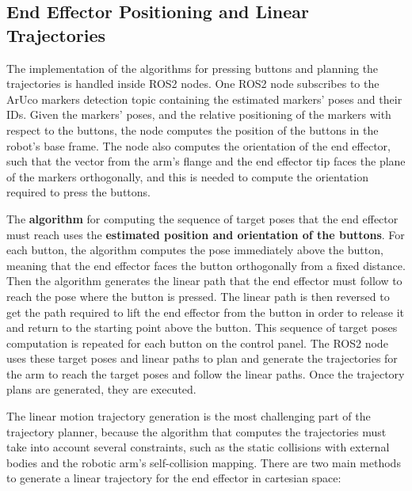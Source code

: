 \subsection{End Effector Positioning and Linear Trajectories}

The implementation of the algorithms for pressing buttons and planning the trajectories is handled inside
ROS2 nodes. One ROS2 node subscribes to the ArUco markers detection topic containing the estimated markers' poses 
and their IDs. Given the markers' poses, and the relative positioning of the markers with respect to the buttons,
the node computes the position of the buttons in the robot's base frame. The node also computes the orientation
of the end effector, such that the vector from the arm's flange and the end effector tip
faces the plane of the markers orthogonally, and this is needed to compute the orientation required to press the buttons.

The \textbf{algorithm} for computing the sequence of target poses that the end effector must reach uses the 
\textbf{estimated position and orientation of the buttons}. For each button, the algorithm computes the pose 
immediately above the button, meaning that the end effector faces the button orthogonally from a fixed distance.
Then the algorithm generates the linear path that the end effector must follow to reach the pose where 
the button is pressed. The linear path is then reversed to get the path required to lift the end effector 
from the button in order to release it and return to the starting point above the button. This sequence
of target poses computation is repeated for each button on the control panel. The ROS2 node uses these target 
poses and linear paths to plan and generate the trajectories for the arm to reach the target poses and 
follow the linear paths. Once the trajectory plans are generated, they are executed.

The linear motion trajectory generation is the most challenging part of the trajectory planner,
because the algorithm that computes the trajectories must take into account several constraints,
such as the static collisions with external bodies and the robotic arm's self-collision mapping.
There are two main methods to generate a linear trajectory for the end effector in cartesian space:

